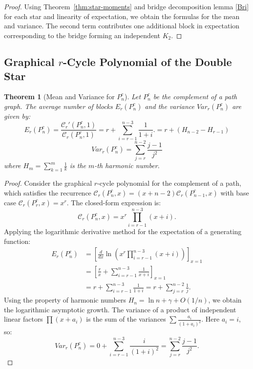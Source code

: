 \documentclass{amsart}
\newtheorem{theorem}{Theorem}[section]
\theoremstyle{definition}
\begin{document}
\begin{proof}
Using Theorem~\ref{thm:star-moments} and bridge decomposition lemma \ref{Bri} for each star and linearity of expectation,
we obtain the formulas for the mean and variance. The second term contributes
one additional block in expectation corresponding to the bridge forming an
independent $K_2$.
\end{proof}

\subsection{Graphical $r$-Cycle Polynomial of the Double Star}

\begin{theorem}[Mean and Variance for $P_n^c$]
Let $P_n^c$ be the complement of a path graph. The average number of blocks $E_r(P_n^c)$ and the variance $Var_r(P_n^c)$ are given by:
\begin{equation}
        E_r(P_n^c) = \frac{\mathcal{C}_r'(P_n^c, 1)}{\mathcal{C}_r(P_n^c, 1)} = r + \sum_{i=r-1}^{n-3} \frac{1}{1+i}.
 = r + (H_{n-2} - H_{r-1})
\end{equation}
\begin{equation}
    Var_r(P_n^c) = \sum_{j=r}^{n-2} \frac{j-1}{j^2}
\end{equation}
where $H_m = \sum_{k=1}^m \frac{1}{k}$ is the $m$-th harmonic number.
\end{theorem}
\begin{proof}
Consider the graphical $r$-cycle polynomial for the complement of a path, which satisfies the recurrence $\mathcal{C}_r(P_n^c, x) = (x + n-2) \mathcal{C}_r(P_{n-1}^c, x)$ with base case $\mathcal{C}_r(P_r^c, x) = x^r$. The closed-form expression is:
\begin{equation*}
    \mathcal{C}_r(P_n^c, x) = x^r \prod_{i=r-1}^{n-3} (x + i).
\end{equation*}
Applying the logarithmic derivative method for the expectation of a generating function:
\begin{align*}
    E_r(P_n^c) &= \left[ \frac{d}{dx} \ln \left( x^r \prod_{i=r-1}^{n-3} (x + i) \right) \right]_{x=1} \\
    &= \left[ \frac{r}{x} + \sum_{i=r-1}^{n-3} \frac{1}{x + i} \right]_{x=1} \\
    &= r + \sum_{i=r-1}^{n-3} \frac{1}{1 + i} = r + \sum_{j=r}^{n-2} \frac{1}{j}.
\end{align*}
Using the property of harmonic numbers $H_n = \ln n + \gamma + O(1/n)$, we obtain the logarithmic asymptotic growth.
The variance of a product of independent linear factors $\prod (x+a_i)$ is the sum of the variances $\sum \frac{a_i}{(1+a_i)^2}$. Here $a_i = i$, so:
\begin{equation*}
    Var_r(P_n^c) = 0 + \sum_{i=r-1}^{n-3} \frac{i}{(1+i)^2} = \sum_{j=r}^{n-2} \frac{j-1}{j^2}.
\end{equation*}
\end{proof}
\end{document}
